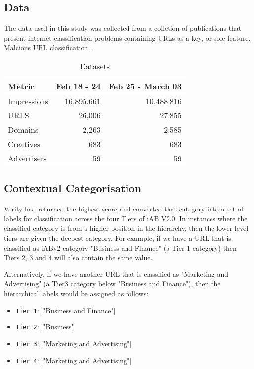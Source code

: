 \documentclass[sigconf]{acmart}
\begin{document}
\subsection{Data}

The data used in this study was collected from a collction of publications that 
present internet classification problems containing URLs as a key, or sole feature.
Malcious URL classification \cite{Mamun2016}.

\begin{table}
\caption{Datasets}
\label{tab:dataset}
\begin{tabular}{|l|r|r|}
\toprule
Metric          &Feb 18 - 24    &Feb 25 - March 03          \\
\midrule
Impressions     &16,895,661     &10,488,816     \\
URLS            &26,006         &27,855         \\
Domains         &2,263          &2,585          \\
Creatives       &683            &683            \\
Advertisers     &59             &59             \\
\bottomrule
\end{tabular}
\end{table}

\subsection{Contextual Categorisation}

Verity had returned the
highest score and converted that category into a set of labels for
classification across the four Tiers of iAB V2.0. In instances where the
classified category is from a higher position in the hierarchy, then the
lower level tiers are given the deepest category. For example, if we have
a URL that is classified as iABv2 category "Business and Finance"
(a Tier 1 category) then Tiers 2, 3 and 4 will also contain the same value.

Alternatively, if we have another URL that is classified as "Marketing and Advertising"
(a Tier3 category below "Business and Finance"), then the hierarchical labels
would be assigned as follows:

\begin{itemize}
    \item {\texttt{Tier 1}}: ["Business and Finance"]
    \item {\texttt{Tier 2}}: ["Business"]
    \item {\texttt{Tier 3}}: ["Marketing and Advertising"]
    \item {\texttt{Tier 4}}: ["Marketing and Advertising"]
\end{itemize}
\end{document}
